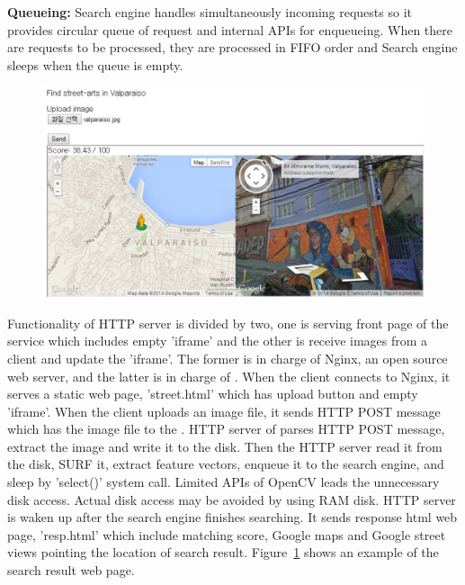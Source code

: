 
\textbf{Queueing:}
Search engine handles simultaneously incoming requests so it provides circular queue of request and internal APIs for enqueueing.
When there are requests to be processed, they are processed in FIFO order and Search engine sleeps when the queue is empty.


\begin{figure}[t]
	\centering
	\includegraphics[scale=0.38]{figs/web_sample}
	\vspace{-0.1in}
	\vspace{-0.1in}
	\label{fig:web_sample}
\end{figure}

Functionality of HTTP server is divided by two, one is serving front page of the service which includes empty 'iframe' and the other is receive images from a client and update the 'iframe'.
The former is in charge of Nginx, an open source web server, and the latter is in charge of \name{}.
When the client connects to Nginx, it serves a static web page, 'street.html' which has upload button and empty 'iframe'.
When the client uploads an image file, it sends HTTP POST message which has the image file to the \name{}.
HTTP server of \name{} parses HTTP POST message, extract the image and write it to the disk.
Then the HTTP server read it from the disk, SURF it, extract feature vectors, enqueue it to the search engine, and sleep by 'select()' system call.
Limited APIs of OpenCV leads the unnecessary disk access.
Actual disk access may be avoided by using RAM disk.
HTTP server is waken up after the search engine finishes searching.
It sends response html web page, 'resp.html' which include matching score, Google maps and Google street views pointing the location of search result.
Figure~\ref{fig:web_sample} shows an example of the search result web page.
